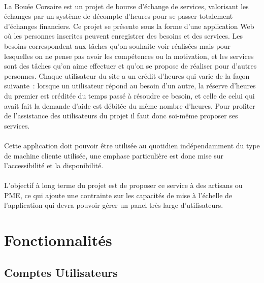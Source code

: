 \documentclass[french]{article}
\begin{document}
		\paragraph{}
			La Bouée Corsaire est un projet de bourse d’échange de services,
			 valorisant les échanges par un système de décompte d’heures pour se
			 passer totalement d’échanges financiers. Ce projet se présente sous la
			 forme d’une application Web où les personnes inscrites peuvent
			 enregistrer des besoins et des services. Les besoins correspondent aux
			 tâches qu’on souhaite voir réalisées mais pour lesquelles on ne pense pas
			 avoir les compétences ou la motivation, et les services sont des tâches
			 qu’on aime effectuer et qu’on se propose de réaliser pour d’autres
			 personnes. Chaque utilisateur du site a un crédit d’heures qui varie de
			 la façon suivante : lorsque un utilisateur répond au besoin d’un autre,
			 la réserve d’heures du premier est créditée du temps passé à résoudre ce
			 besoin, et celle de celui qui avait fait la demande d’aide est débitée du
			 même nombre d’heures. Pour profiter de l’assistance des utilisateurs du
			 projet il faut donc soi-même proposer ses services.
		\paragraph{}
			Cette application doit pouvoir être utilisée au quotidien indépendamment
			 du type de machine cliente utilisée, une emphase particulière est donc
			 mise sur l’accessibilité et la disponibilité.
		\paragraph{}
			L’objectif à long terme du projet est de proposer ce service à des
			 artisans ou PME, ce qui ajoute une contrainte sur les capacités de mise à
			 l’échelle de l’application qui devra pouvoir gérer un panel très large
			 d’utilisateurs.
			
	\newpage
	\section{Fonctionnalités}
		\localtableofcontents
		
		\newpage
		\subsection{Comptes Utilisateurs}
			
\end{document}
